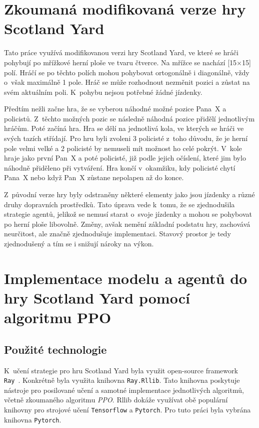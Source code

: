 \section{Zkoumaná modifikovaná verze hry Scotland Yard}\label{sec:zkoumana-modifikovana-verze-hry-scotland-yard}

Tato práce využívá modifikovanou verzi hry Scotland Yard, ve které se hráči pohybují po mřížkové herní ploše ve tvaru čtverce.
Na mřížce se nachází {\color{red}[15$\times$15]} polí.
Hráčí se po těchto polích mohou pohybovat ortogonálně i diagonálně, vždy o~však maximálně 1 pole.
Hráč se může rozhodnout nezměnit pozici a zůstat na svém aktuálním poli.
K~pohybu nejsou potřebné žádné jízdenky.

Předtím nežli začne hra, že se vyberou náhodné možné pozice Pana~X a policistů.
Z~těchto možných pozic se následně náhodná pozice přidělí jednotlivým hráčům.
Poté začíná hra.
Hra se dělí na jednotlivá kola, ve kterých se hráči ve svých tazích střídají.
Pro hru byli zvoleni 3 policisté z~toho důvodu, že je herní pole velmi velké a 2 policisté by nemuseli mít možnost ho celé pokrýt.
V~kole hraje jako první Pan~X a poté policisté, již podle jejich očíslení, které jim bylo náhodně přiděleno při vytváření.
Hra končí v~okamžiku, kdy policisté chytí Pana~X nebo když Pan~X zůstane nepolapen až do konce.

Z~původní verze hry byly odstraněny některé elementy jako jsou jízdenky a různé druhy dopravních prostředků.
Tato úprava vede k~tomu, že se zjednodušila strategie agentů, jelikož se nemusí starat o~svoje jízdenky a mohou se pohybovat po herní ploše libovolně.
Změny, avšak nemění základní podstatu hry, zachovává neurčitost, ale značně zjednodušuje implementaci.
Stavový prostor je tedy zjednodušený a tím se i snižují nároky na výkon.

\section{Implementace modelu a agentů do hry Scotland Yard pomocí algoritmu PPO}
\label{sec:implementace}

\subsection{Použité technologie}\label{subsec:pouzite-technologie}
K~učení strategie pro hru Scotland Yard byla využit open-source framework \texttt{Ray}~\cite{Ray}.
Konkrétně byla využita knihovna \texttt{Ray.Rllib}.
Tato knihovna poskytuje nástroje pro posilované učení a samotné implementace jednotlivých algoritmů, včetně zkoumaného algoritmu \emph{PPO}.
Rllib dokáže využívat obě populární knihovny pro strojové učení \texttt{Tensorflow} a \texttt{Pytorch}.
Pro tuto práci byla vybrána knihovna \texttt{Pytorch}.

